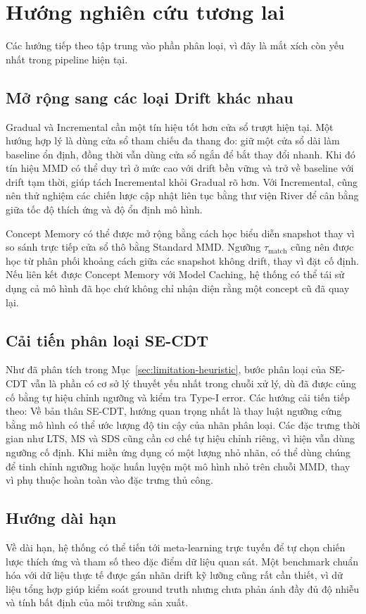 \section{Hướng nghiên cứu tương lai}

Các hướng tiếp theo tập trung vào phần phân loại, vì đây là mắt xích còn yếu nhất trong pipeline hiện tại.

\subsection{Mở rộng sang các loại Drift khác nhau}
Gradual và Incremental cần một tín hiệu tốt hơn cửa sổ trượt hiện tại. Một hướng hợp lý là dùng cửa sổ tham chiếu đa thang đo: giữ một cửa sổ dài làm baseline ổn định, đồng thời vẫn dùng cửa sổ ngắn để bắt thay đổi nhanh. Khi đó tín hiệu MMD có thể duy trì ở mức cao với drift bền vững và trở về baseline với drift tạm thời, giúp tách Incremental khỏi Gradual rõ hơn. Với Incremental, cũng nên thử nghiệm các chiến lược cập nhật liên tục bằng thư viện River để cân bằng giữa tốc độ thích ứng và độ ổn định mô hình.

Concept Memory có thể được mở rộng bằng cách học biểu diễn snapshot thay vì so sánh trực tiếp cửa sổ thô bằng Standard MMD. Ngưỡng $\tau_{\text{match}}$ cũng nên được học từ phân phối khoảng cách giữa các snapshot không drift, thay vì đặt cố định. Nếu liên kết được Concept Memory với Model Caching, hệ thống có thể tái sử dụng cả mô hình đã học chứ không chỉ nhận diện rằng một concept cũ đã quay lại.

\subsection{Cải tiến phân loại SE-CDT}
\label{sec:future-secdt-classification}
Như đã phân tích trong Mục~\ref{sec:limitation-heuristic}, bước phân loại của SE-CDT vẫn là phần có cơ sở lý thuyết yếu nhất trong chuỗi xử lý, dù đã được củng cố bằng tự hiệu chỉnh ngưỡng và kiểm tra Type-I error. Các hướng cải tiến tiếp theo:
Về bản thân SE-CDT, hướng quan trọng nhất là thay luật ngưỡng cứng bằng mô hình có thể ước lượng độ tin cậy của nhãn phân loại. Các đặc trưng thời gian như LTS, MS và SDS cũng cần cơ chế tự hiệu chỉnh riêng, vì hiện vẫn dùng ngưỡng cố định. Khi miền ứng dụng có một lượng nhỏ nhãn, có thể dùng chúng để tinh chỉnh ngưỡng hoặc huấn luyện một mô hình nhỏ trên chuỗi MMD, thay vì phụ thuộc hoàn toàn vào đặc trưng thủ công.

\subsection{Hướng dài hạn}
Về dài hạn, hệ thống có thể tiến tới meta-learning trực tuyến để tự chọn chiến lược thích ứng và tham số theo đặc điểm dữ liệu quan sát. Một benchmark chuẩn hóa với dữ liệu thực tế được gán nhãn drift kỹ lưỡng cũng rất cần thiết, vì dữ liệu tổng hợp giúp kiểm soát ground truth nhưng chưa phản ánh đầy đủ độ nhiễu và tính bất định của môi trường sản xuất.

